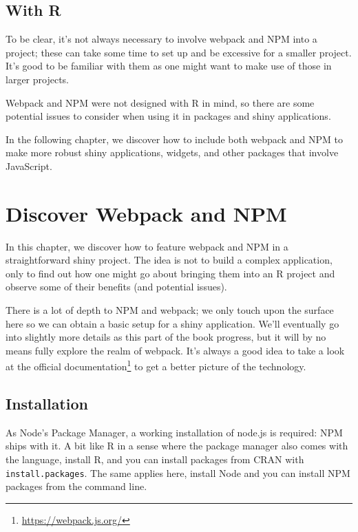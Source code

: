 \documentclass[
  10pt,
]{krantz}
\renewcommand{\href}[2]{#2\footnote{\url{#1}}}
\begin{document}
\hypertarget{webpack-conclude}{%
\section{With R}\label{webpack-conclude}}

To be clear, it's not always necessary to involve webpack and NPM into a project; these can take some time to set up and be excessive for a smaller project. It's good to be familiar with them as one might want to make use of those in larger projects.

Webpack and NPM were not designed with R in mind, so there are some potential issues to consider when using it in packages and shiny applications.

In the following chapter, we discover how to include both webpack and NPM to make more robust shiny applications, widgets, and other packages that involve JavaScript.

\hypertarget{webpack-intro-discover}{%
\chapter{Discover Webpack and NPM}\label{webpack-intro-discover}}

In this chapter, we discover how to feature webpack and NPM in a straightforward shiny project. The idea is not to build a complex application, only to find out how one might go about bringing them into an R project and observe some of their benefits (and potential issues).

There is a lot of depth to NPM and webpack; we only touch upon the surface here so we can obtain a basic setup for a shiny application. We'll eventually go into slightly more details as this part of the book progress, but it will by no means fully explore the realm of webpack. It's always a good idea to take a look at the \href{https://webpack.js.org/}{official documentation} to get a better picture of the technology.

\hypertarget{webpack-intro-install}{%
\section{Installation}\label{webpack-intro-install}}

As Node's Package Manager, a working installation of node.js is required: NPM ships with it. A bit like R in a sense where the package manager also comes with the language, install R, and you can install packages from CRAN with \texttt{install.packages}. The same applies here, install Node and you can install NPM packages from the command line.
\end{document}
